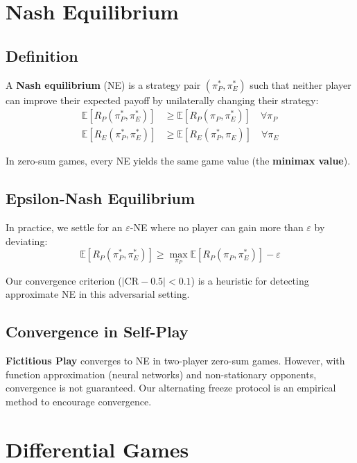 \documentclass[11pt,a4paper]{report}
\begin{document}
\section{Nash Equilibrium}

\subsection{Definition}

A \textbf{Nash equilibrium} (NE) is a strategy pair $(\pi^*_P, \pi^*_E)$ such that neither player can improve their expected payoff by unilaterally changing their strategy:
\begin{align}
    \mathbb{E}[R_P(\pi^*_P, \pi^*_E)] &\geq \mathbb{E}[R_P(\pi_P, \pi^*_E)] \quad \forall \pi_P \\
    \mathbb{E}[R_E(\pi^*_P, \pi^*_E)] &\geq \mathbb{E}[R_E(\pi^*_P, \pi_E)] \quad \forall \pi_E
\end{align}

In zero-sum games, every NE yields the same game value (the \textbf{minimax value}).

\subsection{Epsilon-Nash Equilibrium}

In practice, we settle for an $\varepsilon$-NE where no player can gain more than $\varepsilon$ by deviating:
\begin{equation}
    \mathbb{E}[R_P(\pi^*_P, \pi^*_E)] \geq \max_{\pi_P} \mathbb{E}[R_P(\pi_P, \pi^*_E)] - \varepsilon
\end{equation}

Our convergence criterion ($|\text{CR} - 0.5| < 0.1$) is a heuristic for detecting approximate NE in this adversarial setting.

\subsection{Convergence in Self-Play}

\textbf{Fictitious Play} converges to NE in two-player zero-sum games. However, with function approximation (neural networks) and non-stationary opponents, convergence is not guaranteed. Our alternating freeze protocol is an empirical method to encourage convergence.

\section{Differential Games}
\end{document}
